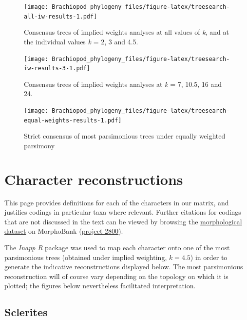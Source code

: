 \documentclass[openany]{book}
\theoremstyle{definition}
\theoremstyle{definition}
\theoremstyle{definition}
\theoremstyle{remark}
\begin{document}
\begin{figure}
\centering
\texttt{[image: Brachiopod\_phylogeny\_files/figure-latex/treesearch-all-iw-results-1.pdf]}
\caption{\label{fig:treesearch-all-iw-results}Consensus trees of implied weights analyses
at all values of \emph{k}, and at the individual
values \emph{k} = 2, 3 and 4.5.}
\end{figure}

\clearpage 

\begin{figure}
\centering
\texttt{[image: Brachiopod\_phylogeny\_files/figure-latex/treesearch-iw-results-3-1.pdf]}
\caption{\label{fig:treesearch-iw-results-3}Consensus trees of implied weights analyses
at \emph{k} = 7, 10.5, 16 and 24.}
\end{figure}

\clearpage

\begin{figure}
\centering
\texttt{[image: Brachiopod\_phylogeny\_files/figure-latex/treesearch-equal-weights-results-1.pdf]}
\caption{\label{fig:treesearch-equal-weights-results}Strict consensus of
most parsimonious trees under equally weighted parsimony}
\end{figure}

\clearpage

\hypertarget{reconstructions}{\chapter{Character
reconstructions}\label{reconstructions}}

This page provides definitions for each of the characters in our matrix,
and justifies codings in particular taxa where relevant. Further
citations for codings that are not discussed in the text can be viewed
by browsing the \protect\hyperlink{dataset}{morphological dataset} on
MorphoBank (\href{https://morphobank.org/permalink/?P2800}{project
2800}).

The \emph{Inapp} \emph{R} package \citep{Brazeau2018} was used to map
each character onto one of the most parsimonious trees (obtained under
implied weighting, \(k = 4.5\)) in order to generate the indicative
reconstructions displayed below. The most parsimonious reconstruction
will of course vary depending on the topology on which it is plotted;
the figures below nevertheless facilitated interpretation.

\section{Sclerites}\label{sclerites}
\end{document}
